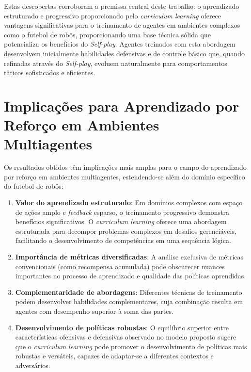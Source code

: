 Estas descobertas corroboram a premissa central deste trabalho: o aprendizado estruturado e progressivo proporcionado pelo \textit{curriculum learning} oferece vantagens significativas para o treinamento de agentes em ambientes complexos como o futebol de robôs, proporcionando uma base técnica sólida que potencializa os benefícios do \textit{Self-play}. Agentes treinados com esta abordagem desenvolvem inicialmente habilidades defensivas e de controle básico que, quando refinadas através do \textit{Self-play}, evoluem naturalmente para comportamentos táticos sofisticados e eficientes.

\section{Implicações para Aprendizado por Reforço em Ambientes Multiagentes}

Os resultados obtidos têm implicações mais amplas para o campo do aprendizado por reforço em ambientes multiagentes, estendendo-se além do domínio específico do futebol de robôs:

\begin{enumerate}
    \item \textbf{Valor do aprendizado estruturado}: Em domínios complexos com espaço de ações amplo e \textit{feedback} esparso, o treinamento progressivo demonstra benefícios significativos. O \textit{curriculum learning} oferece uma abordagem estruturada para decompor problemas complexos em desafios gerenciáveis, facilitando o desenvolvimento de competências em uma sequência lógica.
    
    \item \textbf{Importância de métricas diversificadas}: A análise exclusiva de métricas convencionais (como recompensa acumulada) pode obscurecer nuances importantes no processo de aprendizado e qualidade das políticas aprendidas.
    
    \item \textbf{Complementaridade de abordagens}: Diferentes técnicas de treinamento podem desenvolver habilidades complementares, cuja combinação resulta em agentes com desempenho superior à soma das partes.
    
    \item \textbf{Desenvolvimento de políticas robustas}: O equilíbrio superior entre características ofensivas e defensivas observado no modelo proposto sugere que o \textit{curriculum learning} pode promover o desenvolvimento de políticas mais robustas e versáteis, capazes de adaptar-se a diferentes contextos e adversários.
\end{enumerate}

